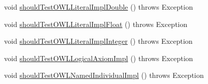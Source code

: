 \begin{DoxyCompactItemize}
\item 
void \hyperlink{classorg_1_1semanticweb_1_1owlapi_1_1contract_1_1_contract_owlapi__2_test_a2cae8afca44803e3254c035d93cf2fff}{should\-Test\-O\-W\-L\-Literal\-Impl\-Double} ()  throws Exception 
\item 
void \hyperlink{classorg_1_1semanticweb_1_1owlapi_1_1contract_1_1_contract_owlapi__2_test_aff0c00d79c27e654add4429400e0111a}{should\-Test\-O\-W\-L\-Literal\-Impl\-Float} ()  throws Exception 
\item 
void \hyperlink{classorg_1_1semanticweb_1_1owlapi_1_1contract_1_1_contract_owlapi__2_test_aa37eb3b429003e8a859294c33c8d1d05}{should\-Test\-O\-W\-L\-Literal\-Impl\-Integer} ()  throws Exception 
\item 
void \hyperlink{classorg_1_1semanticweb_1_1owlapi_1_1contract_1_1_contract_owlapi__2_test_ad32160773be8751fd7d6edb410d84368}{should\-Test\-O\-W\-L\-Logical\-Axiom\-Impl} ()  throws Exception 
\item 
void \hyperlink{classorg_1_1semanticweb_1_1owlapi_1_1contract_1_1_contract_owlapi__2_test_a3f32a0250be2dd28cb6503695f7e96f5}{should\-Test\-O\-W\-L\-Named\-Individual\-Impl} ()  throws Exception 
\end{DoxyCompactItemize}


